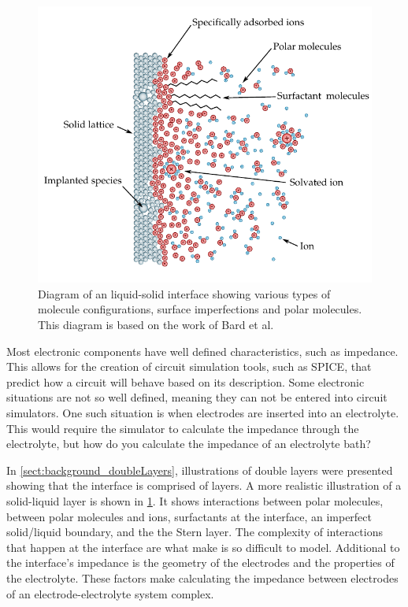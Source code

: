   \begin{figure}
    \begin{center}
      \includegraphics{content/introduction/graphics/interface}
    \end{center}
    \caption{Diagram of an liquid-solid interface showing various types of molecule configurations, surface imperfections and polar molecules. This diagram is based on the work of Bard et al. \cite{Bard1993}}
    \label{fig:interface}
  \end{figure}

  Most electronic components have well defined characteristics, such as impedance.
  This allows for the creation of circuit simulation tools, such as SPICE, that predict how a circuit will behave based on its description.
  Some electronic situations are not so well defined, meaning they can not be entered into circuit simulators.
  One such situation is when electrodes are inserted into an electrolyte.
  This would require the simulator to calculate the impedance through the electrolyte, but how do you calculate the impedance of an electrolyte bath?

  In \cref{sect:background_doubleLayers}, illustrations of double layers were presented showing that the interface is comprised of layers.
  A more realistic illustration of a solid-liquid layer is shown in \cref{fig:interface}.
  It shows interactions between polar molecules, between polar molecules and ions, surfactants at the interface, an imperfect solid/liquid boundary, and the the Stern layer.
  The complexity of interactions that happen at the interface are what make is so difficult to model.
  Additional to the interface's impedance is the geometry of the electrodes and the properties of the electrolyte.
  These factors make calculating the impedance between electrodes of an electrode-electrolyte system complex.


